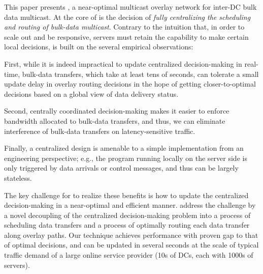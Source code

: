 This paper presents {\em \name}, a near-optimal multicast
overlay network for inter-DC bulk data multicast.
At the core of \name is the decision of {\em fully centralizing
the scheduling and routing of bulk-data multicast}.
Contrary to the intuition that, in order to scale out
and be responsive, servers must retain the capability to make
certain local decisions, \name is built on the several
empirical observations:
\begin{packeditemize}
\item First, while it is indeed impractical to update centralized
decision-making in real-time, bulk-data transfers, which take
at least tens of seconds, can tolerate a small update delay in
overlay routing decisions
in the hope of getting closer-to-optimal decisions based on
a global view of data delivery status.
\item Second, centrally coordinated decision-making makes it easier
to enforce bandwidth allocated to bulk-data transfers,
and thus, we can eliminate interference of bulk-data
transfers on latency-sensitive traffic.
\item Finally, a centralized design is amenable to a simple
implementation from an engineering perspective;
e.g., the program running locally on the server side is
only triggered by data arrivals or control messages, and
thus can be largely stateless.
\end{packeditemize}

The key challenge for \name to realize these benefits is how to
update the centralized decision-making in a near-optimal and
efficient manner.
\name address the challenge by a novel decoupling of the
centralized decision-making problem into a process of scheduling
data transfers and a process of optimally routing each data
transfer along overlay paths.
Our technique achieves performance with proven gap to that of
optimal decisions, and can be updated in several seconds at the
scale of typical traffic demand of a large online service
provider (10s of DCs, each with 1000s of servers).

